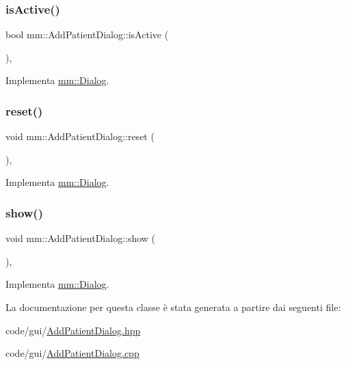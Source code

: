 \subsubsection{\texorpdfstring{is\+Active()}{isActive()}}
{\footnotesize\ttfamily bool mm\+::\+Add\+Patient\+Dialog\+::is\+Active (\begin{DoxyParamCaption}{ }\end{DoxyParamCaption})\hspace{0.3cm}{\ttfamily [override]}, {\ttfamily [virtual]}}



Implementa \hyperlink{classmm_1_1_dialog_a22abaf4e90b6fdca5c20039f6b9e15ac}{mm\+::\+Dialog}.

\mbox{\label{classmm_1_1_add_patient_dialog_a64c8c2ea3b1c69a858f4eaec1854270a}} 
\subsubsection{\texorpdfstring{reset()}{reset()}}
{\footnotesize\ttfamily void mm\+::\+Add\+Patient\+Dialog\+::reset (\begin{DoxyParamCaption}{ }\end{DoxyParamCaption})\hspace{0.3cm}{\ttfamily [override]}, {\ttfamily [virtual]}}



Implementa \hyperlink{classmm_1_1_dialog_abe6e5ac072c12c06971f60491f079d80}{mm\+::\+Dialog}.

\mbox{\label{classmm_1_1_add_patient_dialog_a0247912794984eb19c43842ab9037708}} 
\subsubsection{\texorpdfstring{show()}{show()}}
{\footnotesize\ttfamily void mm\+::\+Add\+Patient\+Dialog\+::show (\begin{DoxyParamCaption}{ }\end{DoxyParamCaption})\hspace{0.3cm}{\ttfamily [override]}, {\ttfamily [virtual]}}



Implementa \hyperlink{classmm_1_1_dialog_afda4b0dc7c0ac027c4b8fdb95713700f}{mm\+::\+Dialog}.



La documentazione per questa classe è stata generata a partire dai seguenti file\+:\begin{DoxyCompactItemize}
\item 
code/gui/\hyperlink{_add_patient_dialog_8hpp}{Add\+Patient\+Dialog.\+hpp}\item 
code/gui/\hyperlink{_add_patient_dialog_8cpp}{Add\+Patient\+Dialog.\+cpp}\end{DoxyCompactItemize}
